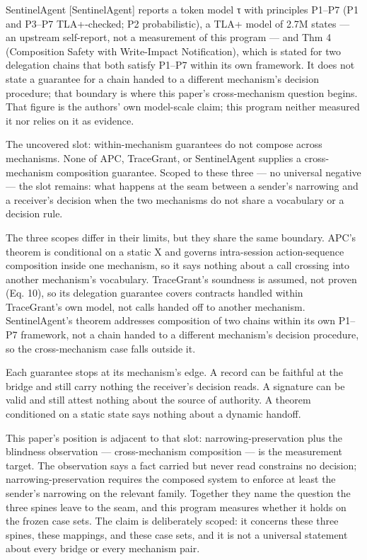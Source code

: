 \documentclass[
  10pt,
]{article}
\renewcommand{\_}{\allowbreak\origunderscore}
\begin{document}
SentinelAgent {[}SentinelAgent{]} reports a token model τ with
principles P1--P7 (P1 and P3--P7 TLA+-checked; P2 probabilistic), a TLA+
model of 2.7M states --- an upstream self-report, not a measurement of
this program --- and Thm 4 (Composition Safety with Write-Impact
Notification), which is stated for two delegation chains that both
satisfy P1--P7 within its own framework. It does not state a guarantee
for a chain handed to a different mechanism's decision procedure; that
boundary is where this paper's cross-mechanism question begins. That
figure is the authors' own model-scale claim; this program neither
measured it nor relies on it as evidence.

The uncovered slot: within-mechanism guarantees do not compose across
mechanisms. None of APC, TraceGrant, or SentinelAgent supplies a
cross-mechanism composition guarantee. Scoped to these three --- no
universal negative --- the slot remains: what happens at the seam
between a sender's narrowing and a receiver's decision when the two
mechanisms do not share a vocabulary or a decision rule.

The three scopes differ in their limits, but they share the same
boundary. APC's theorem is conditional on a static X and governs
intra-session action-sequence composition inside one mechanism, so it
says nothing about a call crossing into another mechanism's vocabulary.
TraceGrant's soundness is assumed, not proven (Eq. 10), so its
delegation guarantee covers contracts handled within TraceGrant's own
model, not calls handed off to another mechanism. SentinelAgent's
theorem addresses composition of two chains within its own P1--P7
framework, not a chain handed to a different mechanism's decision
procedure, so the cross-mechanism case falls outside it.

Each guarantee stops at its mechanism's edge. A record can be faithful
at the bridge and still carry nothing the receiver's decision reads. A
signature can be valid and still attest nothing about the source of
authority. A theorem conditioned on a static state says nothing about a
dynamic handoff.

This paper's position is adjacent to that slot: narrowing-preservation
plus the blindness observation --- cross-mechanism composition --- is
the measurement target. The observation says a fact carried but never
read constrains no decision; narrowing-preservation requires the
composed system to enforce at least the sender's narrowing on the
relevant family. Together they name the question the three spines leave
to the seam, and this program measures whether it holds on the frozen
case sets. The claim is deliberately scoped: it concerns these three
spines, these mappings, and these case sets, and it is not a universal
statement about every bridge or every mechanism pair.
\end{document}

